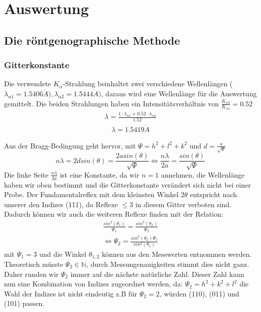 \section{Auswertung}
    \subsection{Die röntgenographische Methode}
        \subsubsection{Gitterkonstante}
            Die verwendete $K_{\alpha}$-Strahlung beinhaltet zwei verschiedene Wellenlängen ($\lambda_{\alpha 1} = 1.5406 \mathring{A}), \lambda_{\alpha 2} = 1.5444 \mathring{A})$,
            daraus wird eine Wellenlänge
            für die Auswertung gemittelt. Die beiden Strahlungen haben ein Intensitätsverhältnis von $\frac{K_{\alpha 2}}{K_{\alpha 1}} = 0.52$
            \begin{align}
                \lambda = \frac{1 \cdot \lambda_{\alpha 1} + 0.52 \cdot \lambda_{\alpha 2}}{1.52}
            \end{align}
            \begin{align*}
                \lambda = 1.5419 \mathring{A}
            \end{align*}

            Aus der Bragg-Bedingung geht hervor, mit $\Psi =  h^2 + l^2 + k^2$ und $d = \frac{a}{\sqrt{\Psi}}$
            \begin{equation}
                n \lambda = 2dsin(\theta) = \frac{2asin(\theta)}{\sqrt{\Psi}} \Leftrightarrow \frac{n \lambda}{2a} = \frac{sin(\theta)}{\sqrt{\Psi}}
            \end{equation}
            Die linke Seite $\frac{n \lambda}{2a}$ ist eine Konstante, da wir $n=1$ annehmen, die Wellenlänge haben wir oben 
            bestimmt und die Gitterkonstante verändert sich nicht bei einer Probe. Der Fundamentalreflex mit dem kleinsten Winkel
            $2\theta$ entspricht nach unserer den Indizes (111), da Reflexe $\leq 3$ in diesem Gitter
            verboten sind. Dadurch können wir auch die 
            weiteren Reflexe finden mit der Relation:
            \begin{align}
                \frac{sin^2(\theta_1)}{\Psi_1} = \frac{sin^2(\theta_2)}{\Psi_2} \\
                \Leftrightarrow \Psi_2 = \frac{sin^2(\theta_2)\Psi_1}{sin^2(\theta_1)}
            \end{align}
            mit $\Psi_1 = 3$ und die Winkel $\theta_{1,2}$ können aus den Messwerten entnommen werden. Theoretisch
            müsste $\Psi_2 \in \mathbb{N}$, durch Messungenauigkeiten stimmt dies nicht ganz. Daher runden wir $\Psi_2$ immer auf die 
            nächste natürliche Zahl. Dieser Zahl kann nun eine Kombination von Indizes zugeordnet werden, da:
            $\Psi_2 = h^2+k^2+l^2$ die Wahl der Indizes ist nicht eindeutig z.B für $\Psi_2 = 2$, würden (110), (011) und (101) passen.
            
